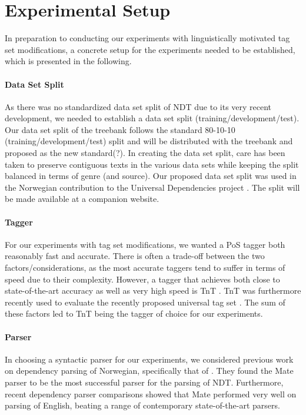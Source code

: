 \documentclass[11pt,a4paper]{article}
\begin{document}
\section{Experimental Setup}
\label{sec:setup}
In preparation to conducting our experiments with linguistically motivated tag
set modifications, a concrete setup for the experiments needed to be
established, which is presented in the following.

\paragraph{Data Set Split}
As there was no standardized data set split of NDT due to its very recent
development, we needed to establish a data set split
(training/development/test). Our data set split of the treebank follows the
standard 80-10-10 (training/development/test) split and will be distributed
with the treebank and proposed as the new standard(?). In creating the data set
split, care has been taken to preserve contiguous texts in the various data
sets while keeping the split balanced in terms of genre (and source). Our
proposed data set split was used in the Norwegian contribution to the Universal
Dependencies project \cite{Ovr:Hoh:16}.  The split will be made available at a
companion website.

\paragraph{Tagger}
For our experiments with tag set modifications, we wanted a PoS tagger both
reasonably fast and accurate. There is often a trade-off between the two
factors/considerations, as the most accurate taggers tend to suffer in terms of
speed due to their complexity. However, a tagger that achieves both close to
state-of-the-art accuracy as well as very high speed is TnT \cite{Bra:00}. TnT
was furthermore recently used to evaluate the recently proposed universal tag
set \cite{Pet:Das:McD:12}. The sum of these factors led to TnT being the tagger
of choice for our experiments.

\paragraph{Parser}
In choosing a syntactic parser for our experiments, we considered previous work
on dependency parsing of Norwegian, specifically that of \cite{Sol:Skj:Ovr:14}.
They found the Mate parser \cite{Boh:10} to be the most successful parser for
the parsing of NDT. Furthermore, recent dependency parser comparisons
\cite{Cho:Tet:Ste:15} showed that Mate performed very well on parsing of
English, beating a range of contemporary state-of-the-art parsers.
\end{document}
